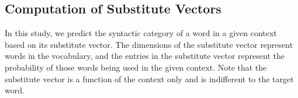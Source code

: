 
\subsection{Computation of Substitute Vectors}
\label{sec:subcomp}

In this study, we predict the syntactic category of a word in a given
context based on its substitute vector.  The dimensions of the
substitute vector represent words in the vocabulary, and the entries
in the substitute vector represent the probability of those words
being used in the given context.  Note that the substitute vector is a
function of the context only and is indifferent to the target word.




